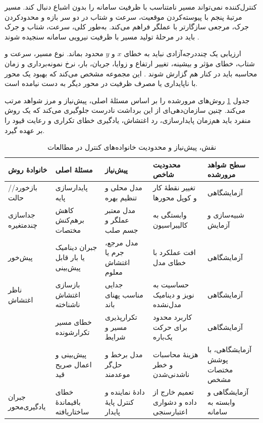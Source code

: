 کنترل‌کننده نمی‌تواند مسیر نامتناسب با ظرفیت سامانه را بدون اشباع دنبال کند. مسیر مرتبهٔ پنجم با پیوسته‌کردن موقعیت، سرعت و شتاب در دو سر بازه و محدودکردن جرک، مرجعی سازگارتر با عملگر فراهم می‌کند. به‌طور کلی، سرعت، شتاب و جرک باید در مرحلهٔ تولید مسیر با ظرفیت نیرویی سامانه سنجیده شوند \cite{songMotionControlWafer2024}.

ارزیابی یک  چنددرجه‌آزادی نباید به خطای $x$ و $y$ محدود بماند. نوع مسیر، سرعت و شتاب، خطای مؤثر و بیشینه، تغییر ارتفاع و زوایا، جریان، بار، نرخ نمونه‌برداری و زمان محاسبه باید در کنار هم گزارش شوند \cite{xuPredictorbasedModelPredictive2023}. این مجموعه مشخص می‌کند که بهبود یک محور با ناپایداری یا مصرف ظرفیت در محور دیگر به دست نیامده است.

جدول \ref{tab:control-method-roles} روش‌های مرورشده را بر اساس مسئلهٔ اصلی، پیش‌نیاز و مرز شواهد مرتب می‌کند. چنین سازمان‌دهی‌ای از این برداشت نادرست جلوگیری می‌کند که یک روش منفرد باید هم‌زمان پایدارسازی، رد اغتشاش، یادگیری خطای تکراری و رعایت قیود را بر عهده گیرد.

\begin{table}[htbp]
	\centering
	\caption{نقش، پیش‌نیاز و محدودیت خانواده‌های کنترل در مطالعات }
	\label{tab:control-method-roles}
	\renewcommand{\arraystretch}{1.22}
	\setlength{\tabcolsep}{3pt}
	\scriptsize
	\begin{tabular}{|p{}|p{}|p{}|p{}|p{}|}
		\hline
		\textbf{خانوادهٔ روش} & \textbf{مسئلهٔ اصلی} & \textbf{پیش‌نیاز} & \textbf{محدودیت شاخص} & \textbf{سطح شواهد مرورشده} \\
		\hline
		\lr{PID}/\lr{PD}/بازخورد حالت & پایدارسازی پایه & مدل محلی و تنظیم بهره & تغییر نقطهٔ کار و کوپل محورها & آزمایشگاهی \cite{miyasakaMagneticLevitationUnlimited2014} \\
		\hline
		جداسازی چندمتغیره & کاهش برهم‌کنش مختصات & مدل معتبر عملگر و جسم صلب & وابستگی به کالیبراسیون & شبیه‌سازی و آزمایش \cite{chenEnhancedDecouplingStrategy2025} \\
		\hline
		پیش‌خور & جبران دینامیک یا بار قابل پیش‌بینی & مدل مرجع، جرم یا اغتشاش معلوم & افت عملکرد با خطای مدل & آزمایشگاهی \cite{haRobustAirgapStabilization2026} \\
		\hline
		ناظر اغتشاش & بازسازی اغتشاش ناشناخته & جدایی مناسب پهنای باند & حساسیت به نویز و دینامیک مدل‌نشده & آزمایشگاهی \\
		\hline
		\lr{ILC} & خطای مسیر تکرارشونده & تکرارپذیری مسیر و شرایط & کاربرد محدود برای حرکت یک‌باره & آزمایشگاهی \cite{curtisstewartImplementationModularMagnetic2023} \\
		\hline
		\lr{MPC} & پیش‌بینی و اعمال صریح قید & مدل برخط و حل‌گر موعدمند & هزینهٔ محاسبات و خطر ناشدنی‌شدن & آزمایشگاهی، با پوشش مختصات مشخص \cite{xuPredictorbasedModelPredictive2023} \\
		\hline
		جبران یادگیری‌محور & خطای باقیماندهٔ ساختاریافته & دادهٔ نماینده و کنترل پایهٔ پایدار & تعمیم خارج از داده و دشواری اعتبارسنجی & آزمایشگاهی و وابسته به سامانه \cite{liuHybridHarmonicRBFNNBased2025,wangRealTimeDeepReinforcement2026d} \\
		\hline
	\end{tabular}
\end{table}


